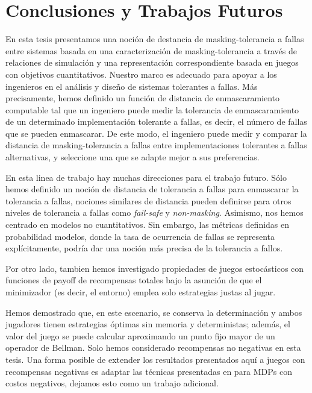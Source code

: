 \chapter{Conclusiones y Trabajos Futuros}
\label{cap:conclusiones}

En esta tesis presentamos una noción de destancia de masking-tolerancia a fallas
entre sistemas basada en una caracterización de masking-tolerancia a través de relaciones de simulación y una representación correspondiente basada en juegos con objetivos cuantitativos.
Nuestro marco es adecuado para apoyar a los ingenieros en el análisis y
diseño de sistemas tolerantes a fallas. Más precisamente, hemos definido un
función de distancia de enmascaramiento computable tal que un ingeniero
puede medir la tolerancia de enmascaramiento de un determinado
implementación tolerante a fallas, es decir, el número de fallas que se pueden enmascarar.
De este modo, el ingeniero puede medir y comparar la distancia de masking-tolerancia a fallas 
entre implementaciones tolerantes a fallas alternativas, y seleccione una que
se adapte mejor a sus preferencias.

En esta linea de trabajo hay muchas direcciones para el trabajo futuro. Sólo hemos definido un
noción de distancia de tolerancia a fallas para enmascarar la tolerancia a fallas,
nociones similares de distancia pueden definirse para otros niveles de
tolerancia a fallas como \emph{fail-safe} y \emph{non-masking}. Asimismo, nos hemos centrado
en modelos no cuantitativos. Sin embargo, las métricas definidas en probabilidad
modelos, donde la tasa de ocurrencia de fallas se representa explícitamente,
podría dar una noción más precisa de la tolerancia a fallos.

Por otro lado, tambien hemos investigado propiedades de juegos estocásticos con funciones de payoff de recompensas totales bajo la asunción de que el minimizador (es decir, el entorno) emplea solo estrategias justas al jugar.  %

Hemos demostrado que, en este escenario, se conserva la determinación y ambos jugadores tienen estrategias óptimas sin memoria y deterministas; además, el valor del juego se puede calcular aproximando un punto fijo mayor de un operador de Bellman. Solo hemos considerado recompensas no negativas en esta tesis. Una forma posible de extender los resultados presentados aquí a juegos con recompensas negativas es adaptar las técnicas presentadas en \cite{DBLP:conf/lics/Baier0DGS18} para MDPs con costos negativos, dejamos esto como un trabajo adicional.

